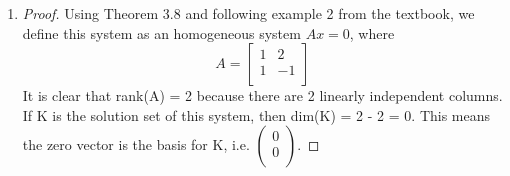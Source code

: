 \documentclass[11pt]{scrartcl}
\begin{document}
\begin{enumerate}[label=\alph*.]
{\begin{proof}
			If K is	the solution set of this system, then dim(K) = 3 - 2 = 1. 
			Thus any nonzero solution constitutes a basis for K. For example, since
			$
			\begin{pmatrix}
				0\\
				1\\
				1\\
			\end{pmatrix}
			$
			is a solution for K, it forms a basis by Corollary 2 of Theorem 1.10.
		\end{proof}
	}
	\item{
	\begin{proof}
		Using Theorem 3.8 and following example 2 from the textbook, we define this system as an homogeneous system $Ax=0$, where 
		\[
			A=
		\begin{bmatrix}
			1 & 2\\
			1 & -1\\
		\end{bmatrix}
		\]
		It is clear that rank(A) = 2 because there are 2 linearly independent columns.
		If K is	the solution set of this system, then dim(K) = 2 - 2 = 0. 
		This means the zero vector is the basis for K, i.e.
		$
		\begin{pmatrix}
			0\\
			0\\
		\end{pmatrix}
		$.
	\end{proof}
	}
\end{enumerate}
\end{document}
